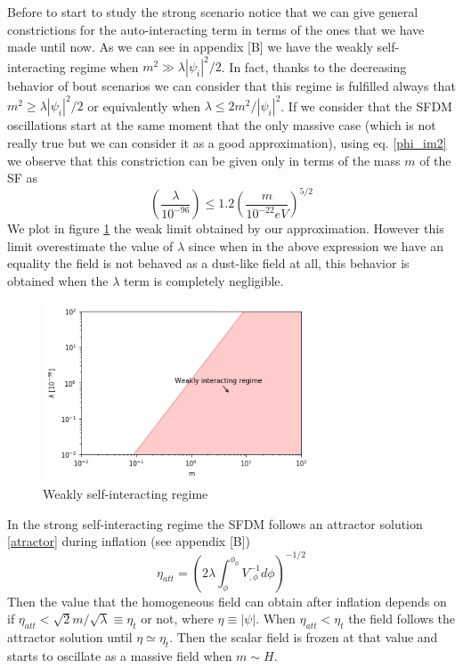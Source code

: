 \documentclass[amssymb,twocolumn,prd,nofootinbib,showpacs]{revtex4-1}
\begin{document}
Before to start to study the strong scenario notice that we can give general constrictions for the auto-interacting term in terms of the ones that we have made until now. As we can see in appendix [B] we have the weakly self-interacting regime when $m^2\gg \lambda|\psi_i|^2/2$. In fact, thanks to the decreasing behavior of bout scenarios we can consider that this regime is fulfilled always that $m^2\geq \lambda|\psi_i|^2/2$ or equivalently when $\lambda\leq 2m^2/|\psi_i|^2$. If we consider that the SFDM oscillations start at the same moment that the only massive case (which is not really true but we can consider it as a good approximation), using eq. \eqref{phi_im2} we observe that this constriction can be given only in terms of the mass $m$ of the SF as
\begin{equation}
\left(\frac{\lambda}{10^{-96}}\right)\leq 1.2\left(\frac{m}{10^{-22}eV}\right)^{5/2}
\end{equation}
We plot in figure \ref{weekregime} the weak limit obtained by our approximation. However this limit overestimate the value of $\lambda$ since when in the above expression we have an equality the field is not behaved as a dust-like field at all, this behavior is obtained when the $\lambda$ term is completely negligible.
\begin{figure}
\includegraphics[width=8cm]{weakregime.png}
\caption{Weakly self-interacting regime}
\label{weekregime}
\end{figure} 

In the strong self-interacting regime the SFDM follows an attractor solution \eqref{atractor} during inflation (see appendix [B]) 
\begin{equation}\label{atractor0}
\eta_{att} =\left(2\lambda\int_{\phi}^{\phi_0}V^{-1}_{,\phi}d\phi\right)^{-1/2}
\end{equation}
Then the value that the homogeneous field can obtain after inflation depends on if $\eta_{att}<\sqrt{2}m/\sqrt{\lambda}\equiv \eta_t$ or not, where $\eta\equiv |\psi|$. When $\eta_{att}<\eta_t$ the field follows the attractor solution until $\eta\simeq \eta_t$. Then the scalar field is frozen at that value and starts to oscillate as a massive field when $m\sim H$. 
\end{document}
